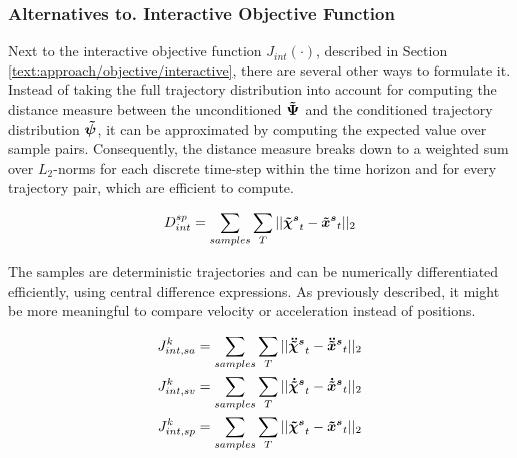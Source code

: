 \subsubsection{Alternatives to. Interactive Objective Function}
Next to the interactive objective function $J_{int}(\cdot)$, described in Section \ref{text:approach/objective/interactive}, there are several other ways to formulate it. Instead of taking the full trajectory distribution into account for computing the distance measure between the unconditioned $\distwo[]$ and the conditioned trajectory distribution $\dist[]$, it can be approximated by computing the expected value over sample pairs. Consequently, the distance measure breaks down to a weighted sum over $L_2$-norms for each discrete time-step within the time horizon and for every trajectory pair, which are efficient to compute.

\begin{equation}
D_{int}^{sp} = \sum_{samples} \sum_T ||\xpedwo[s]_t - \xped[s]_t||_2
\end{equation}

The samples are deterministic trajectories and can be numerically differentiated efficiently, using central difference expressions. As previously described, it might be more meaningful to compare velocity or acceleration instead of positions.

\begin{align}
J_{int, sa}^{k} &= \sum_{samples} \sum_T ||\ddxpedwo[s]_t - \ddxped[s]_t||_2	 \\
J_{int, sv}^{k} &= \sum_{samples} \sum_T ||\dxpedwo[s]_t - \dxped[s]_t||_2	 \\
J_{int, sp}^{k} &= \sum_{samples} \sum_T ||\xpedwo[s]_t - \xped[s]_t||_2
\label{eq:interaction_diff}	
\end{align}

